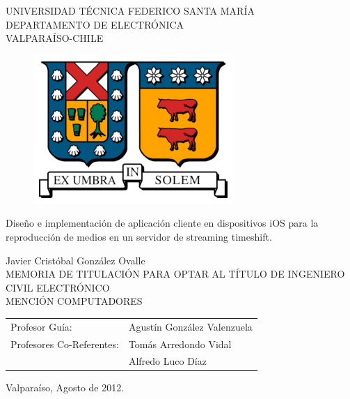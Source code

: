 \begin{titlepage}

\begin{center}

	\large  UNIVERSIDAD TÉCNICA FEDERICO SANTA MARÍA 	\\
 	\large \sc DEPARTAMENTO DE ELECTRÓNICA						\\
 	\large \sc VALPARAÍSO-CHILE												\\
\begin{figure}[h!]
	\centering
 	\includegraphics[scale=1]{imgs/logo_utfsm.eps} 
\end{figure}
\end{center}

\begin{center}
 \LARGE{Diseño e implementación de aplicación cliente en dispositivos iOS para la reproducción de medios en un servidor de streaming timeshift.}
\end{center}

\begin{center}
 \normalsize Javier Cristóbal González Ovalle\\
 \normalsize MEMORIA DE TITULACIÓN PARA OPTAR AL TÍTULO DE
 \normalsize INGENIERO CIVIL ELECTRÓNICO			\\
 \normalsize MENCIÓN COMPUTADORES
\end{center}
\vspace*{1.5cm}

\begin{center}
\begin{tabular}{ll}
 \normalsize Profesor Guía: & Agustín González Valenzuela\\
 \normalsize Profesores Co-Referentes: &Tomás Arredondo Vidal\\
 															&Alfredo Luco Díaz
\end{tabular}
\end{center}
 
\vspace*{2cm}
\begin{center}
 \normalsize Valparaíso, Agosto de 2012. \\
\end{center}
\end{titlepage}